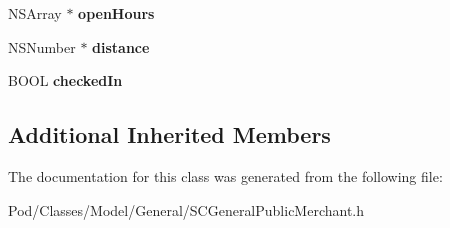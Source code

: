 \begin{DoxyCompactItemize}
\item 
N\+S\+Array $\ast$ {\bfseries open\+Hours}\hypertarget{interface_s_c_general_public_merchant_a96c320c0e1329ebe88ddfac20dd28318}{}\label{interface_s_c_general_public_merchant_a96c320c0e1329ebe88ddfac20dd28318}

\item 
N\+S\+Number $\ast$ {\bfseries distance}\hypertarget{interface_s_c_general_public_merchant_a7d2ee7e62c646fa8f433077166683741}{}\label{interface_s_c_general_public_merchant_a7d2ee7e62c646fa8f433077166683741}

\item 
B\+O\+OL {\bfseries checked\+In}\hypertarget{interface_s_c_general_public_merchant_adb919e6b1a225880a743ffc9412db609}{}\label{interface_s_c_general_public_merchant_adb919e6b1a225880a743ffc9412db609}

\end{DoxyCompactItemize}
\subsection*{Additional Inherited Members}


The documentation for this class was generated from the following file\+:\begin{DoxyCompactItemize}
\item 
Pod/\+Classes/\+Model/\+General/S\+C\+General\+Public\+Merchant.\+h\end{DoxyCompactItemize}
